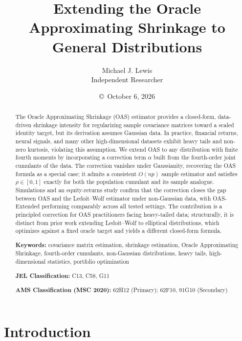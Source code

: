 \documentclass[10pt,twoside,titlepage]{article}
\begin{document}
\title{Extending the Oracle Approximating Shrinkage to General Distributions}
\author{Michael J. Lewis\\
\small Independent Researcher}
\date{\copyright\ October 6, 2026}

\maketitle

\begin{abstract}
The Oracle Approximating Shrinkage (OAS) estimator provides a closed-form, data-driven
shrinkage intensity for regularizing sample covariance matrices toward a scaled identity
target, but its derivation assumes Gaussian data.
In practice, financial returns, neural signals, and many other high-dimensional datasets
exhibit heavy tails and non-zero kurtosis, violating this assumption.
We extend OAS to any distribution with finite fourth moments by incorporating a correction
term $\alpha$ built from the fourth-order joint cumulants of the data.
The correction vanishes under Gaussianity, recovering the OAS formula as a special
case; it admits a consistent $O(np)$ sample estimator and satisfies $\rho\in[0,1]$ exactly
for both the population cumulant and its sample analogue.
Simulations and an equity-returns study confirm that the correction closes the gap between
OAS and the Ledoit--Wolf estimator under non-Gaussian data, with OAS-Extended
performing comparably across all tested settings.
The contribution is a principled correction for OAS practitioners facing heavy-tailed data;
structurally, it is distinct from prior work extending Ledoit--Wolf to elliptical
distributions, which optimizes against a fixed oracle target and yields a different
closed-form formula.

\vfill

\noindent\textbf{Keywords:} covariance matrix estimation, shrinkage estimation, Oracle Approximating Shrinkage, fourth-order cumulants, non-Gaussian distributions, heavy tails, high-dimensional statistics, portfolio optimization

\medskip

\noindent\textbf{JEL Classification:} C13, C58, G11

\noindent\textbf{AMS Classification (MSC 2020):} 62H12 (Primary); 62F10, 91G10 (Secondary)
\end{abstract}

\clearpage

\section{Introduction}\label{sec-intro}
\end{document}
